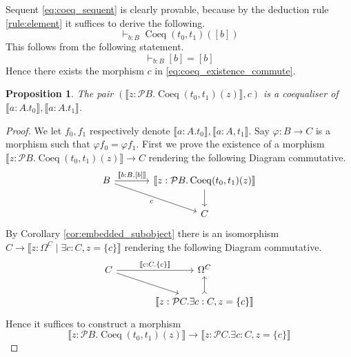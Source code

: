 \documentclass{birkjour}
\theoremstyle{plain}
\newtheorem{proposition}[thm]{Proposition}
\theoremstyle{definition}
\newcommand{\call}[1]{\mathcal{#1}}
\newcommand{\lto}{\longrightarrow}
\begin{document}
	Sequent \eqref{eq:coeq_sequent} is clearly provable, because by the deduction rule \eqref{rule:element} it suffices to derive the following.
	\begin{equation}
		\vdash_{b:B}\operatorname{Coeq}(t_0,t_1)([b])
	\end{equation}
	This follows from the following statement.
	\begin{equation}
		\vdash_{b:B}[b] = [b]
	\end{equation}
	Hence there exists the morphism $c$ in \eqref{eq:coeq_existence_commute}.
	\begin{proposition}
		The pair $(\llbracket z: \call{P}B. \operatorname{Coeq}(t_0,t_1)(z)\rrbracket,c)$ is a coequaliser of $\llbracket a:A. t_0\rrbracket, \llbracket a:A. t_1\rrbracket$.
	\end{proposition}
	\begin{proof}
		We let $f_0,f_1$ respectively denote $\llbracket a:A. t_0\rrbracket, \llbracket a:A, t_1\rrbracket$. Say $\varphi: B \lto C$ is a morphism such that $\varphi f_0 = \varphi f_1$. First we prove the existence of a morphism $\llbracket z: \call{P}B. \operatorname{Coeq}(t_0,t_1)(z)\rrbracket \lto C$ rendering the following Diagram commutative.
		\begin{equation}
			\begin{tikzcd}[column sep = large]
				B\arrow[dr,swap,"c"]\arrow[r,"{\llbracket b:B. [b]\rrbracket}"] & \llbracket z: \call{P}B. \operatorname{Coeq}(t_0,t_1)(z)\rrbracket\arrow[d]\\
				& C
			\end{tikzcd}
		\end{equation}
		By Corollary \ref{cor:embedded_subobject} there is an isomorphism $C \lto \llbracket z: \Omega^C \mid \exists c:C, z = \lbrace c \rbrace \rrbracket$ rendering the following Diagram commutative.
		\begin{equation}
			\begin{tikzcd}[column sep = large]
				C\arrow[r,"{\llbracket c:C. \lbrace c \rbrace \rrbracket}"]\arrow[dr] & \Omega^C\\
				& \llbracket z: \call{P}C . \exists c:C, z = \lbrace c \rbrace \rrbracket\arrow[u,rightarrowtail]
			\end{tikzcd}
		\end{equation}
		Hence it suffices to construct a morphism
		\begin{equation}
			\llbracket z: \call{P}B . \operatorname{Coeq}(t_0,t_1)(z)\rrbracket \lto \llbracket z: \call{P}C. \exists c: C, z = \lbrace c \rbrace \rrbracket

\end{equation}
\end{proof}
\end{document}
